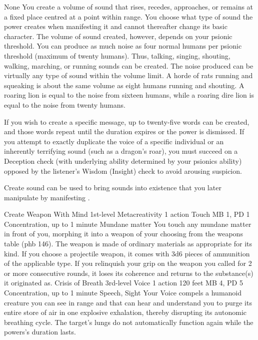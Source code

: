     {None}
You create a volume of sound that rises,
recedes, approaches, or remains at a fixed place centred at
a point within range. You choose what type of sound the power
creates when manifesting it and cannot thereafter change its
basic character. The volume of sound created, however, depends
on your psionic threshold. You can produce as much noise as
four normal humans per psionic threshold (maximum of twenty humans).
Thus, talking, singing, shouting, walking, marching, or running
sounds can be created. The noise produced can be virtually
any type of sound within the volume limit. A horde of rats
running and squeaking is about the same volume as eight humans
running and shouting. A roaring lion is equal to the noise
from sixteen humans, while a roaring dire lion is equal to
the noise from twenty humans.

If you wish to create a specific message, up to twenty-five
words can be created, and those words repeat
until the duration expires or the power is dismissed. If you
attempt to exactly duplicate the voice of a specific individual
or an inherently terrifying sound (such as a dragon's roar),
you must succeed on a Deception check
(with underlying ability determined by your psionics ability)
opposed by the listener's
Wisdom (Insight) check to avoid arousing suspicion.

Create sound can be used to bring sounds into existence that
you later manipulate by manifesting .

\DndPowerHeader%
    {Create Weapon With Mind\label{pwr:create-weapon-with-mind}}
    {1st-level Metacreativity}
    {1 action}
    {Touch}
    {MB 1, PD 1}
    {Concentration, up to 1 minute}
    {Mundane matter}
You touch any mundane matter in front of
you, morphing it into a weapon of your choosing from the weapons
table (phb 146). The weapon is made of ordinary materials
as appropriate for its kind. If you choose a projectile weapon,
it comes with 3d6 pieces of ammunition of the applicable type.
If you relinquish your grip on the weapon you called for 2
or more consecutive rounds, it loses its coherence and returns
to the substance(s) it originated as.
\DndPowerHeader%
    {Crisis of Breath\label{pwr:crisis-of-breath}}
    {3rd-level Voice}
    {1 action}
    {120 feet}
    {MB 4, PD 5}
    {Concentration, up to 1 minute}
    {Speech, Sight}
Your Voice compels a humanoid creature you
can see in range
and that can hear and understand you
to purge its entire store of air in one explosive
exhalation, thereby disrupting its autonomic breathing
cycle. The target's lungs do not automatically function again
while the powers's duration lasts.

